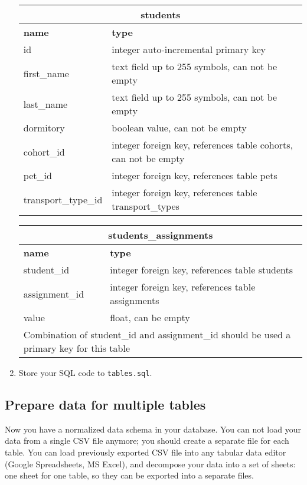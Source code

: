 \documentclass[12pt]{article}
\newcommand{\code}[1]{\texttt{#1}}
\begin{document}
\begin{enumerate}
\begin{tabular}{| l | l | }
  \hline
  \multicolumn{2}{|c|}{\textbf{students}}  \\
  \hline
  \textbf{name} & \textbf{type} \\
  \hline
  id & integer auto-incremental primary key \\
  first\_name & text field up to 255 symbols, can not be empty \\
  last\_name & text field up to 255 symbols, can not be empty \\
  dormitory & boolean value, can not be empty \\
  cohort\_id & integer foreign key, references table cohorts, can not be empty \\
  pet\_id  & integer foreign key, references table pets \\
  transport\_type\_id & integer foreign key, references table transport\_types \\
  \hline
\end{tabular}

\begin{tabular}{| l | l | }
  \hline
  \multicolumn{2}{|c|}{\textbf{students\_assignments}}  \\
  \hline
  \textbf{name} & \textbf{type} \\
  \hline
  student\_id & integer foreign key, references table students \\
  assignment\_id & integer foreign key, references table assignments \\
  value & float, can be empty \\
  \hline
  \multicolumn{2}{|p{12cm}|}{ Combination of student\_id and assignment\_id should be used a primary key for this table }  \\
  \hline
\end{tabular}

\item Store your SQL code to \code{tables.sql}.

\end{enumerate}

\subsection*{Prepare data for multiple tables}

Now you have a normalized data schema in your database. You can not load your data from a single CSV file anymore; you should create a separate file for each table. You can load previously exported CSV file into any tabular data editor (Google Spreadsheets, MS Excel), and decompose your data into a set of sheets: one sheet for one table, so they can be exported into a separate files.
\end{document}
